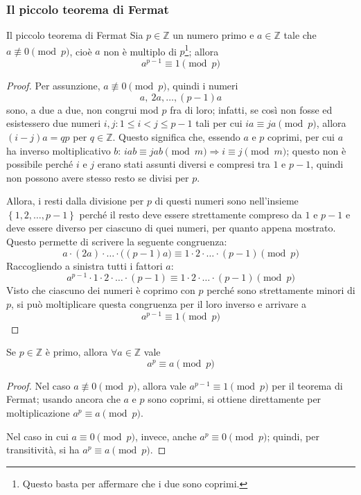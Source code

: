 \documentclass[11pt, a4paper]{scrartcl}
\theoremstyle{definition}
\numberwithin{esempio}{section}
\theoremstyle{definition}
\numberwithin{obs}{section}
\numberwithin{nota}{section}
\numberwithin{equation}{subsection}
\begin{document}
\subsubsection{Il piccolo teorema di Fermat}
\begin{teorema}
	{Il piccolo teorema di Fermat}{}
	Sia $p \in \mathbb{Z}$ un numero primo e $a \in \mathbb{Z}$ tale che $a \not\equiv 0 \pmod{p} $, cio\`e $a $ non \`e multiplo di $p$\footnote{Questo basta per affermare che i due sono coprimi.}; allora 
	\[
	a^{p-1} \equiv 1 \pmod{p} 
	\] 
	\begin{proof}
		Per assunzione, $a\not \equiv 0 \pmod{p} $, quindi i numeri
		\[
		a, \ 2a, \ldots, (p-1) a
		\] 
		sono, a due a due, non congrui mod $p$ fra di loro; infatti, se cos\`i non fosse ed esistessero due numeri $i,j : 1\le  i<j\le p-1$ tali per cui $ia \equiv j a \pmod{p} $, allora $(i-j) a = q p$ per $q \in \mathbb{Z}$. 
		Questo significa che, essendo $a $ e $p$ coprimi, per cui $a$ ha inverso moltiplicativo $b$: $iab \equiv jab \pmod{m} \Rightarrow i \equiv j \pmod{m} $; questo non \`e possibile perch\'e $i$ e $j$ erano stati assunti diversi e compresi tra $1 $ e $p-1$, quindi non possono avere stesso resto se divisi per $p$.

		Allora, i resti dalla divisione per $p$ di questi numeri sono nell'insieme $\left\{ 1,2, \ldots, p-1 \right\} $ perch\'e il resto deve essere strettamente compreso da $1$ e $p-1$ e deve essere diverso per ciascuno di quei numeri, per quanto appena mostrato.
Questo permette di scrivere la seguente congruenza:
\[
a \cdot (2a) \cdot \ldots\cdot \big((p-1) a\big) \equiv 1 \cdot 2 \cdot  \ldots \cdot (p-1) \pmod{p} 
\] 
Raccogliendo a sinistra tutti i fattori $a$:
\[
a^{p-1} \cdot 1 \cdot 2 \cdot \ldots\cdot (p-1) \equiv 1 \cdot 2 \cdot  \ldots \cdot (p-1) \pmod{p} 
\] 
Visto che ciascuno dei numeri \`e coprimo con $p$ perch\'e sono strettamente minori di $p$, si pu\`o moltiplicare questa congruenza per il loro inverso e arrivare a 
\[
a^{p-1} \equiv 1 \pmod{p} 
\] 

	\end{proof}
\end{teorema}
\begin{corollario}
	{}{}
	Se $p\in \mathbb{Z}$ \`e primo, allora $\forall a \in \mathbb{Z}$ vale
	\[
	a^p \equiv a \pmod{p} 
	\] 
	\begin{proof}
		Nel caso $a\not \equiv 0 \pmod{p} $, allora vale $a^{p-1} \equiv 1 \pmod{p} $ per il teorema di Fermat; usando ancora che $a$ e $p$ sono coprimi, si ottiene direttamente per moltiplicazione $a^p \equiv a \pmod{p} $.

		Nel caso in cui $a\equiv 0 \pmod{p} $, invece, anche $a^p \equiv 0 \pmod{p} $; quindi, per transitivit\`a, si ha $a^p \equiv a \pmod{p} $.
	\end{proof}
\end{corollario}
\end{document}
